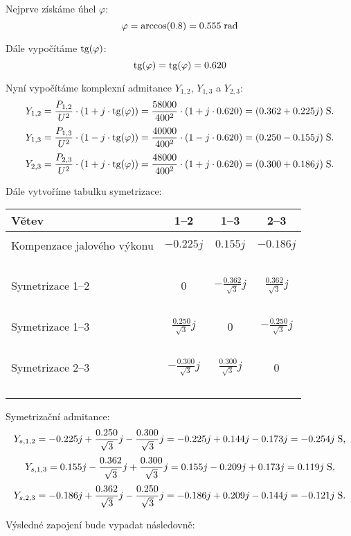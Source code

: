 
    
    Nejprve získáme úhel $\varphi$:
    $$ \varphi = \arccos(0.8) = 0.555 \; \textrm{rad}$$
    
    Dále vypočítáme $\textrm{tg} (\varphi)$:
    $$\textrm{tg} (\varphi) = \textrm{tg} (\varphi) = 0.620$$

    Nyní vypočítáme komplexní admitance $Y_{1,2}$, $Y_{1,3}$ a $Y_{2,3}$:
    $$Y_{1,2} = \frac{P_{1,2}}{U^2} \cdot \left(1 + j \cdot \textrm{tg} (\varphi) \right) = \frac{ 58000 }{ 400^2 } \cdot \left(1 + j \cdot 0.620 \right) = (0.362 + 0.225j) \; \textrm{S}.$$$$Y_{1,3} = \frac{P_{1,3}}{U^2} \cdot \left(1 - j \cdot \textrm{tg} (\varphi) \right) = \frac{ 40000 }{ 400^2 } \cdot \left(1 - j \cdot 0.620 \right) = (0.250 - 0.155j) \; \textrm{S}.$$$$Y_{2,3} = \frac{P_{2,3}}{U^2} \cdot \left(1 + j \cdot \textrm{tg} (\varphi) \right) = \frac{ 48000 }{ 400^2 } \cdot \left(1 + j \cdot 0.620 \right) = (0.300 + 0.186j) \; \textrm{S}.$$

    Dále vytvoříme tabulku symetrizace:
    \begin{table}[H]
    \centering
    \begin{tabular}{l c c c}
    \hline
    Větev & 1--2 & 1--3 & 2--3 \\ \hline \\Kompenzace jalového výkonu & $-0.225j$ & $0.155j$ & $-0.186j$ \\~\\Symetrizace 1--2 & 0 & $-\frac{0.362}{\sqrt{3}}j$ & $\frac{0.362}{\sqrt{3}}j$ \\~\\Symetrizace 1--3 & $\frac{0.250}{\sqrt{3}}j$ & 0 & $-\frac{0.250}{\sqrt{3}}j$ \\~\\Symetrizace 2--3 & $-\frac{0.300}{\sqrt{3}}j$ & $\frac{0.300}{\sqrt{3}}j$ & 0
    \\~\\
    \hline
    \end{tabular}
    \end{table}
    

    Symetrizační admitance:
    $$Y_{s,1,2} = -0.225j+\frac{0.250}{\sqrt{3}}j-\frac{0.300}{\sqrt{3}}j = -0.225j+0.144j-0.173j = -0.254j \; \textrm{S},$$$$Y_{s,1,3} = 0.155j-\frac{0.362}{\sqrt{3}}j+\frac{0.300}{\sqrt{3}}j = 0.155j-0.209j+0.173j = 0.119j \; \textrm{S},$$$$Y_{s,2,3} = -0.186j+\frac{0.362}{\sqrt{3}}j-\frac{0.250}{\sqrt{3}}j = -0.186j+0.209j-0.144j = -0.121j \; \textrm{S}.$$

    Výsledné zapojení bude vypadat následovně:
    
